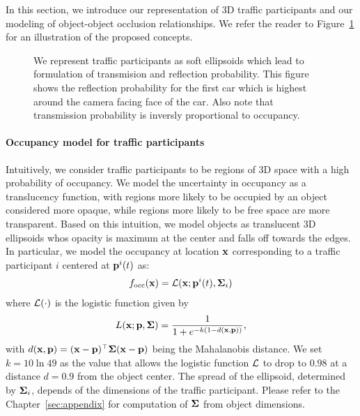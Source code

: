 
In this section, we introduce our representation of 3D traffic participants and our modeling of object-object occlusion relationships. We refer the reader to Figure~\ref{fig:reflectiontransimission} for an illustration of the proposed concepts.

\begin{figure}
  \usetikzlibrary{calc}
  \centering
  \begin{tikzpicture}
    
  \end{tikzpicture}
  \caption{We represent traffic participants as soft ellipsoids which lead to formulation of transmision and reflection probability. This figure shows the reflection probability for the first car which is highest around the camera facing face of the car. Also note that transmission probability is inversly proportional to occupancy.}
  \label{fig:reflectiontransimission}
\end{figure}



\paragraph{Occupancy model for traffic participants}
Intuitively, we consider traffic participants to be regions of 3D space with a high probability of occupancy. We model the uncertainty in occupancy as a translucency function, with regions more likely to be occupied by an object considered more opaque, while regions more likely to be free space are more transparent. Based on this intuition, we model objects as translucent 3D ellipsoids whos opacity is maximum at the center and falls off towards the edges. In particular, we model the occupancy at location $\bx$ corresponding to a traffic participant $i$ centered at $\pos{i}{t}$ as:
\begin{align}
  f_{\text{occ}}(\bx) = \cL(\bx; \pos{i}{t}, \bSigma_i)
\end{align}
where $\cL(\cdot)$ is the logistic function given by
\begin{align}
  L(\bx; \bp, \bSigma) = \frac{1}{1 + e^{-k(1 - d(\mathbf{x},\bp))}},
\end{align}
with $d(\bx, \bp) = (\bx-\bp)^\top\bSigma(\bx-\bp)$ being the Mahalanobis distance. We set $k = 10\ln{49}$ as the value that allows the logistic function $\cL$ to drop to $0.98$ at a distance $d = 0.9$ from the object center. The spread of the ellipsoid, determined by $\bSigma_i$, depends of the dimensions of the traffic participant. Please refer to the Chapter~\ref{sec:appendix} for computation of $\bSigma$ from object dimensions.


